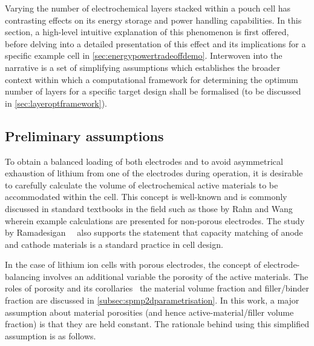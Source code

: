 

Varying the  number of electrochemical  layers stacked  within a pouch  cell has
contrasting effects  on its energy  storage and power handling  capabilities. In
this section,  a high-level  intuitive explanation of  this phenomenon  is first
offered, before  delving into  a detailed  presentation of  this effect  and its
implications for a specific  example cell in \cref{sec:energypowertradeoffdemo}.
Interwoven  into  the  narrative  is  a set  of  simplifying  assumptions  which
establishes  the broader  context  within which  a  computational framework  for
determining the optimum  number of layers for a specific  target design shall be
formalised (to be discussed in \cref{sec:layeroptframework}).

\subsection{Preliminary assumptions}\label{subsec:layeroptassumptions}

To  obtain a  balanced  loading of  both electrodes  and  to avoid  asymmetrical
exhaustion  of lithium  from  one  of the  electrodes  during  operation, it  is
desirable to carefully calculate the  volume of electrochemical active materials
to be accommodated  within the cell. This concept is  well-known and is commonly
discussed  in  standard  textbooks in  the  field  such  as  those by  Rahn  and
Wang~\cite{Rahn2013} wherein  example calculations are presented  for non-porous
electrodes. The study  by Ramadesigan~\etal~\cite{Ramadesigan2012} also supports
the  statement that  capacity  matching  of anode  and  cathode  materials is  a
standard practice in cell design.


In  the  case of  lithium  ion  cells with  porous  electrodes,  the concept  of
electrode-balancing  involves  an additional  variable  \viz{}  the porosity  of
the  active  materials.  The  roles  of porosity  and  its  corollaries  \ie~the
material   volume  fraction   and  filler/binder   fraction  are   discussed  in
\cref{subsec:spmp2dparametrisation}.  In this  work,  a  major assumption  about
material porosities  (and hence active-material/filler volume  fraction) is that
they are held constant. The rationale behind using this simplified assumption is
as follows.


